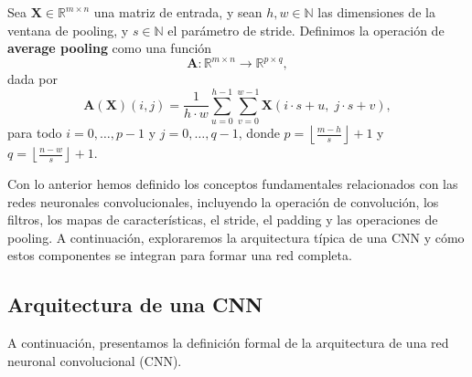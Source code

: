 \begin{definition}

    Sea $\mathbf{X} \in \mathbb{R}^{m \times n}$ una matriz de entrada, y sean $h, w \in \mathbb{N}$ las dimensiones de la ventana de pooling, y $s \in \mathbb{N}$ el parámetro de stride.
    Definimos la operación de \textbf{average pooling} como una función
    \[
        \mathbf{A}: \mathbb{R}^{m \times n} \longrightarrow \mathbb{R}^{p \times q},
    \]
    dada por
    \[
        \mathbf{A}(\mathbf{X})(i,j) =
        \frac{1}{h \cdot w}
        \sum_{u=0}^{h-1}\sum_{v=0}^{w-1}
        \mathbf{X}(i \cdot s + u,\; j \cdot s + v),
    \]
    para todo $i = 0, \ldots, p-1$ y $j = 0, \ldots, q-1$,
    donde $p = \left\lfloor \frac{m - h}{s} \right\rfloor + 1$ y $q = \left\lfloor \frac{n - w}{s} \right\rfloor + 1$.
\end{definition}

Con lo anterior hemos definido los conceptos fundamentales relacionados con las redes neuronales convolucionales, incluyendo la operación de convolución, los filtros, los mapas de características, el stride, el padding y las operaciones de pooling. A continuación, exploraremos la arquitectura típica de una CNN y cómo estos componentes se integran para formar una red completa.

\subsection{Arquitectura de una CNN}
A continuación, presentamos la definición formal de la arquitectura de una red neuronal convolucional (CNN).

